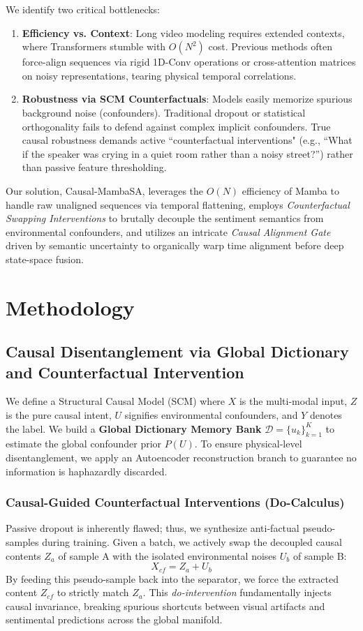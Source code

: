 \documentclass{article}
\begin{document}
We identify two critical bottlenecks:
\begin{enumerate}
    \item \textbf{Efficiency vs. Context}: Long video modeling requires extended contexts, where Transformers stumble with $O(N^2)$ cost. Previous methods often force-align sequences via rigid 1D-Conv operations or cross-attention matrices on noisy representations, tearing physical temporal correlations.
    \item \textbf{Robustness via SCM Counterfactuals}: Models easily memorize spurious background noise (confounders). Traditional dropout or statistical orthogonality fails to defend against complex implicit confounders. True causal robustness demands active ``counterfactual interventions" (e.g., ``What if the speaker was crying in a quiet room rather than a noisy street?'') rather than passive feature thresholding.
\end{enumerate}

Our solution, Causal-MambaSA, leverages the $O(N)$ efficiency of Mamba to handle raw unaligned sequences via temporal flattening, employs \textit{Counterfactual Swapping Interventions} to brutally decouple the sentiment semantics from environmental confounders, and utilizes an intricate \textit{Causal Alignment Gate} driven by semantic uncertainty to organically warp time alignment before deep state-space fusion.

\section{Methodology}

\subsection{Causal Disentanglement via Global Dictionary and Counterfactual Intervention}
We define a Structural Causal Model (SCM) where $X$ is the multi-modal input, $Z$ is the pure causal intent, $U$ signifies environmental confounders, and $Y$ denotes the label. We build a \textbf{Global Dictionary Memory Bank} $\mathcal{D} = \{u_k\}_{k=1}^K$ to estimate the global confounder prior $P(U)$. To ensure physical-level disentanglement, we apply an Autoencoder reconstruction branch to guarantee no information is haphazardly discarded.

\subsubsection{Causal-Guided Counterfactual Interventions (Do-Calculus)}
Passive dropout is inherently flawed; thus, we synthesize anti-factual pseudo-samples during training. Given a batch, we actively swap the decoupled causal contents $Z_a$ of sample A with the isolated environmental noises $U_b$ of sample B:
\begin{equation}
    X_{cf} = Z_a + U_b
\end{equation}
By feeding this pseudo-sample back into the separator, we force the extracted content $Z_{cf}$ to strictly match $Z_a$. This \textit{do-intervention} fundamentally injects causal invariance, breaking spurious shortcuts between visual artifacts and sentimental predictions across the global manifold.
\end{document}

